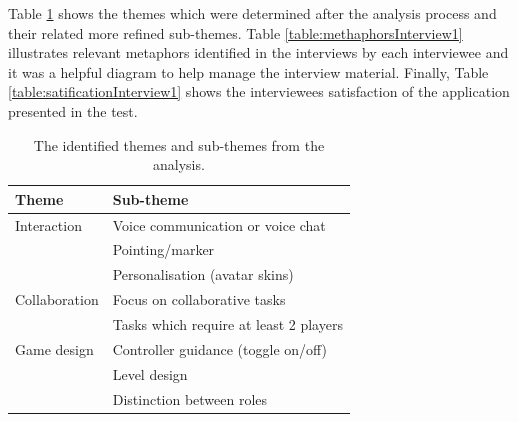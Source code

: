 Table \ref{table:themesInterview1} shows the themes which were determined after the analysis process and their related more refined sub-themes.  Table \ref{table:methaphorsInterview1} illustrates relevant metaphors identified in the interviews by each interviewee and it was a helpful diagram to help manage the interview material. Finally, Table \ref{table:satificationInterview1} shows the interviewees satisfaction of the application presented in the test.     

\begin{table}[!ht]
      \centering
        \begin{tabular}{ll}
        \toprule
        Theme & Sub-theme \\
        \midrule
        Interaction & Voice communication or voice chat\\
        & Pointing/marker \\\vspace{0.2cm}
        & Personalisation (avatar skins) \\
        Collaboration & Focus on collaborative tasks \\\vspace{0.2cm}
        & Tasks which require at least 2 players \\
        Game design & Controller guidance (toggle on/off)\\
        & Level design\\
        & Distinction between roles\\
        \bottomrule
        \end{tabular}
        \caption{The identified themes and sub-themes from the analysis.}
        \label{table:themesInterview1}
\end{table}



